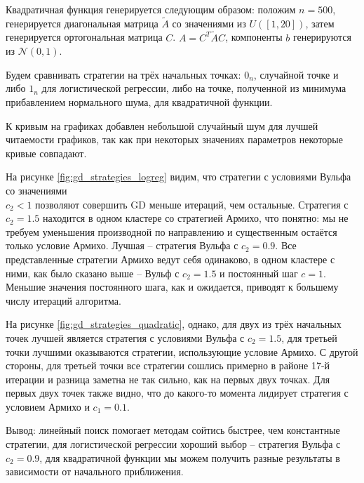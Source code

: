 \documentclass[11pt]{article}
\begin{document}
Квадратичная функция генерируется следующим образом: положим $n=500$, генерируется диагональная матрица $\tilde{A}$ со значениями из $U([1, 20])$, затем генерируется ортогональная матрица $C$. $A = C^T \tilde{A} C$, компоненты $b$ генерируются из $\mathcal{N}(0, 1)$. 

Будем сравнивать стратегии на трёх начальных точках: $0_n$, случайной точке и либо $1_n$ для логистической регрессии, либо на точке, полученной из минимума прибавлением нормального шума, для квадратичной функции.

К кривым на графиках добавлен небольшой случайный шум для лучшей читаемости графиков, так как при некоторых значениях параметров некоторые кривые совпадают. 

На рисунке \ref{fig:gd_strategies_logreg} видим, что стратегии с условиями Вульфа со значениями \\ $c_2 < 1$ позволяют совершить GD меньше итераций, чем остальные. 
Стратегия с $c_2=1.5$ находится в одном кластере со стратегией Армихо, что понятно: мы не требуем уменьшения производной по направлению и существенным остаётся только условие Армихо.
Лучшая -- стратегия Вульфа с $c_2=0.9$. Все представленные стратегии Армихо ведут себя одинаково, в одном кластере с ними, как было сказано выше -- Вульф с $c_2=1.5$ и постоянный шаг $c=1$. Меньшие значения постоянного шага, как и ожидается, приводят к большему числу итераций алгоритма.

На рисунке \ref{fig:gd_strategies_quadratic}, однако, для двух из трёх начальных точек  лучшей является стратегия с условиями Вульфа с $c_2 = 1.5$, для третьей точки лучшими оказываются стратегии, использующие условие Армихо. С другой стороны, для третьей точки все стратегии сошлись примерно в районе 17-й итерации и разница заметна не так сильно, как на первых двух точках. Для первых двух точек также видно, что до какого-то момента лидирует стратегия с условием Армихо и $c_1=0.1$.

Вывод: линейный поиск помогает методам сойтись быстрее, чем константные стратегии, для логистической регрессии хороший выбор -- стратегия Вульфа с $c_2=0.9$, для квадратичной функции мы можем получить разные результаты в зависимости от начального приближения.
\end{document}

